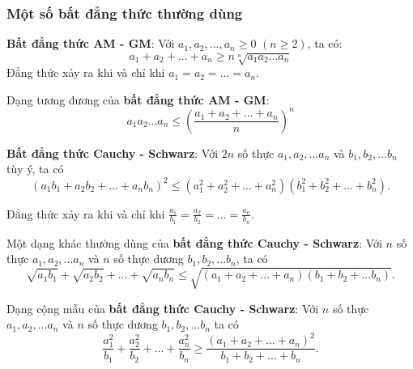 \subsubsection*{Một số bất đẳng thức thường dùng}

\begin{mybox}
\textbf{Bất đẳng thức AM - GM}: Với $a_1, a_2, ..., a_n \ge 0$ $(n \ge 2)$, ta có:
$$
	a_1 + a_2 + ... + a_n \ge n\sqrt[n]{a_1 a_2 ... a_n}
$$
Đẳng thức xảy ra khi và chỉ khi $a_1 = a_2 = ... = a_n$.

Dạng tương đương của \textbf{bất đẳng thức AM - GM}:
$$
	a_1 a_2 ... a_n \le \left(\frac{a_1 + a_2 + ... + a_n}{n}\right)^n
$$
\end{mybox}

\begin{mybox}
\textbf{Bất đẳng thức Cauchy - Schwarz}: Với $2n$ số thực $a_1, a_2, ... a_n$ và
$b_1, b_2, ... b_n$ tùy ý, ta có
$$
	(a_1 b_1 + a_2 b_2 + ... + a_n b_n)^2 \le (a_1^2 + a_2^2 + ... + a_n^2)(b_1^2 + b_2^2 + ... + b_n^2).
$$

Đẳng thức xảy ra khi và chỉ khi $\displaystyle \frac{a_1}{b_1} = \frac{a_2}{b_2} = ... = \frac{a_n}{b_n}$.

\item 
Một dạng khác thường dùng của \textbf{bất đẳng thức Cauchy - Schwarz}: Với $n$ số thực $a_1, a_2, ... a_n$ và $n$ số thực dương $b_1, b_2, ... b_n$, ta có
$$
	\sqrt{a_1 b_1} + \sqrt{a_2 b_2} + ... + \sqrt{a_n b_n} \le \sqrt{(a_1 + a_2 + ... + a_n)(b_1 + b_2 + ... b_n)}.
$$

Dạng cộng mẫu của \textbf{bất đẳng thức Cauchy - Schwarz}:  Với $n$ số thực $a_1, a_2, ... a_n$ và $n$ số thực dương $b_1, b_2, ... b_n$ ta có
$$
	\frac{a_1^2}{b_1} + \frac{a_2^2}{b_2} + ... + \frac{a_n^2}{b_n} \ge \frac{(a_1 + a_2 + ... + a_n)^2}{b_1 + b_2 + ... + b_n}.
$$
\end{mybox}

